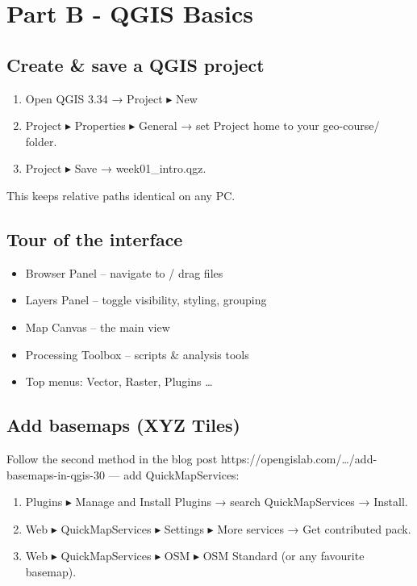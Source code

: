 \documentclass[
  letterpaper,
  DIV=11,
  numbers=noendperiod]{scrreprt}
\providecommand{\tightlist}{%
  \setlength{\itemsep}{0pt}\setlength{\parskip}{0pt}}\usepackage{longtable,booktabs,array}
\begin{document}
\hypertarget{part-b---qgis-basics}{%
\section{Part B - QGIS Basics}\label{part-b---qgis-basics}}

\hypertarget{create-save-a-qgis-project}{%
\subsection{Create \& save a QGIS
project}\label{create-save-a-qgis-project}}

\begin{enumerate}
\def\labelenumi{\arabic{enumi}.}
\tightlist
\item
  Open QGIS 3.34 → Project ▸ New
\item
  Project ▸ Properties ▸ General → set Project home to your geo-course/
  folder.
\item
  Project ▸ Save → week01\_intro.qgz.
\end{enumerate}

This keeps relative paths identical on any PC.

\hypertarget{tour-of-the-interface}{%
\subsection{Tour of the interface}\label{tour-of-the-interface}}

\begin{itemize}
\tightlist
\item
  Browser Panel -- navigate to / drag files
\item
  Layers Panel -- toggle visibility, styling, grouping
\item
  Map Canvas -- the main view
\item
  Processing Toolbox -- scripts \& analysis tools
\item
  Top menus: Vector, Raster, Plugins \ldots{}
\end{itemize}

\hypertarget{add-basemaps-xyz-tiles}{%
\subsection{Add basemaps (XYZ Tiles)}\label{add-basemaps-xyz-tiles}}

Follow the second method in the blog post
https://opengislab.com/\ldots/add-basemaps-in-qgis-30 --- add
QuickMapServices:

\begin{enumerate}
\def\labelenumi{\arabic{enumi}.}
\tightlist
\item
  Plugins ▸ Manage and Install Plugins → search QuickMapServices →
  Install.
\item
  Web ▸ QuickMapServices ▸ Settings ▸ More services → Get contributed
  pack.
\item
  Web ▸ QuickMapServices ▸ OSM ▸ OSM Standard (or any favourite
  basemap).
\end{enumerate}
\end{document}
